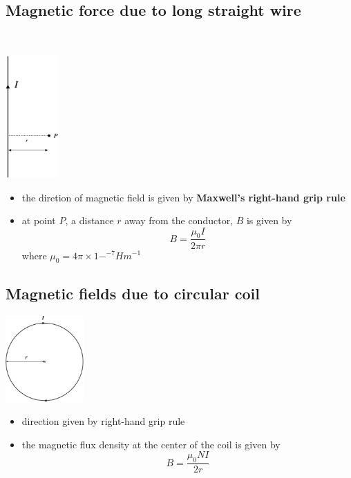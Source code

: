 \documentclass[a4paper, 10pt]{article}
\begin{document}
\subsection{Magnetic force due to long straight wire} \\
\begin{minipage}{0.5\textwidth}
   \begin{center}
    \includegraphics[width=2cm]{figures/3.pdf} 
   \end{center}	
\end{minipage}	
\begin{minipage}{0.5\textwidth}
\begin{itemize}
   \item the diretion of magnetic field is given by \textbf{Maxwell's right-hand grip rule}
   \item at point $P$, a distance $r$  away from the conductor, $B$ is given by
      \[
      B = \frac{\mu_0 I}{2 \pi r}
      \]
      where $\mu_0 = 4\pi \times 1-^{-7} Hm^{-1}$ 
      
\end{itemize}	
\end{minipage}	

\subsection{Magnetic fields due to circular coil}
\begin{minipage}{0.5\textwidth}
   \begin{center}
     \includegraphics[width=3cm]{figures/4.pdf} 
   \end{center}	
\end{minipage}	
\begin{minipage}{0.5\textwidth}
   \begin{itemize}
      \item direction given by right-hand grip rule
      \item the magnetic flux density at the center of the coil is given by
         \[
         B = \frac{\mu_0 N I}{2r}
         \]
   \end{itemize}	
\end{minipage}	
\end{document}
